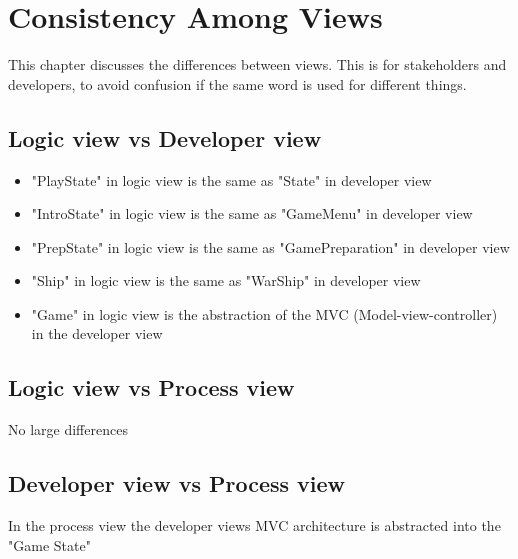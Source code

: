 \chapter{Consistency Among Views}
This chapter discusses the differences between views. This is for stakeholders and developers, to avoid confusion if the same word is used for different things.

\section{Logic view vs Developer view}
	\begin{itemize}
		\item "PlayState" in logic view is the same as "State" in developer view
		\item "IntroState" in logic view is the same as "GameMenu" in developer view
		\item "PrepState" in logic view is the same as "GamePreparation" in developer view
		\item "Ship" in logic view is the same as "WarShip" in developer view
		\item "Game" in logic view is the abstraction of the MVC (Model-view-controller) in the developer view
	\end{itemize}

\section{Logic view vs Process view}
No large differences

\section{Developer view vs Process view}
In the process view the developer views MVC architecture is abstracted into the "Game State"